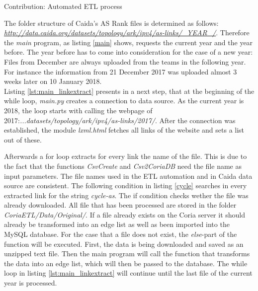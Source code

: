 \documentclass[conference, 11pt]{IEEEtran}
\begin{document}
\begin{subsection}{Contribution: Automated ETL process}
\vspace{0.2cm}

\vspace{0.5cm}


The folder structure of Caida's AS Rank files is determined as follows:  \textit{\url{http://data.caida.org/datasets/topology/ark/ipv4/as-links/_YEAR_/}}. Therefore the \textit{main} program, as listing \ref{main} shows, requests the current year and the year before. The year before has to come into consideration for the case of a new year: Files from December are always uploaded from the teams in the following year. For instance the information from 21 December 2017 was uploaded almost 3 weeks later on 10 January 2018. \\ 

Listing \ref{lst:main_linkextract} presents in a next step, that at the beginning of the while loop, \textit{main.py} creates a connection to data source. As the current year is 2018, the loop starts with calling the webpage of 2017:\textit{...datasets/topology/ark/ipv4/as-links/2017/}. After the connection was established, the module \textit{lxml.html} fetches all links of the website and sets a list out of these. \\ 

\vspace{0.3cm}

\vspace{0.3cm}

Afterwards a for loop extracts for every link the name of the file. This is due to the fact that the functions \textit{CsvCreate} and \textit{Csv2CoriaDB} need the file name as input parameters. The file names used in the ETL automation and in Caida data source are consistent. The following condition in listing \ref{cycle} searches in every extracted link for the string \textit{cycle-as}. The if condition checks wether the file was already downloaded. All file that has been processed are stored in the folder \textit{CoriaETL/Data/Original/}. If a file already exists on the Coria server it should already be transformed into an edge list as well as been imported into the MySQL database. For the case that a file does not exist, the \textit{else}-part of the function will be executed. First, the data is being downloaded and saved as an unzipped text file. 
Then the main program will call the function that transforms the data into an edge list, which will then be passed to the database. 
The while loop in listing \ref{lst:main_linkextract} will continue until the last file of the current year is processed.  \\


\end{subsection}
\end{document}

